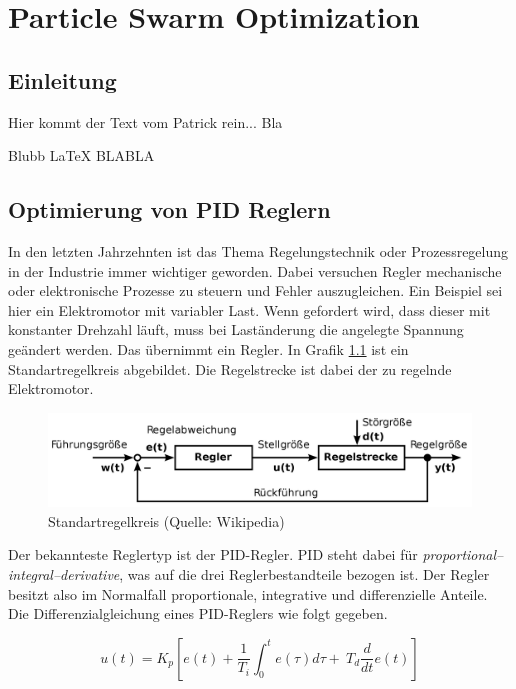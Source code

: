 \chapter{Particle Swarm Optimization}\label{cha:pso}
\section{Einleitung}

Hier kommt der Text vom Patrick rein...
Bla

Blubb
\LaTeX
BLABLA

\section{Optimierung von PID Reglern}

In den letzten Jahrzehnten ist das Thema Regelungstechnik oder Prozessregelung
in der Industrie immer wichtiger geworden. Dabei versuchen Regler mechanische
oder elektronische Prozesse zu steuern und Fehler auszugleichen. Ein Beispiel
sei hier ein Elektromotor mit variabler Last. Wenn gefordert wird, dass dieser
mit konstanter Drehzahl l\"auft, muss bei Last\"anderung die angelegte Spannung
ge\"andert werden. Das \"ubernimmt ein Regler. In Grafik
\ref{pic:einfacher_regelkreis} ist ein Standartregelkreis abgebildet. Die
Regelstrecke ist dabei der zu regelnde Elektromotor.

\begin{figure}[hbtp]
    \centering
    \includegraphics[width=0.8\linewidth]{images/2000px-Einfacher_Regelkreis_n}
    \caption{Standartregelkreis (Quelle: Wikipedia)}
    \label{pic:einfacher_regelkreis}
\end{figure}

Der bekannteste Reglertyp ist der PID-Regler. PID steht dabei f\"ur
\textit{pro\-por\-tional–inte\-gral–deri\-va\-tive}, was auf die drei
Reglerbestandteile bezogen ist. Der Regler besitzt also im Normalfall
proportionale, integrative und differenzielle Anteile. Die Differenzialgleichung
eines PID-Reglers wie folgt gegeben.

\begin{equation}
    u(t)=K_p \left[e(t)+\frac 1{T_i}\int_0^t{e(\tau)}d\tau+\ T_d \frac d{dt}e(t)\right] 
    \label{eq:PID_zeitbereich}
\end{equation}

